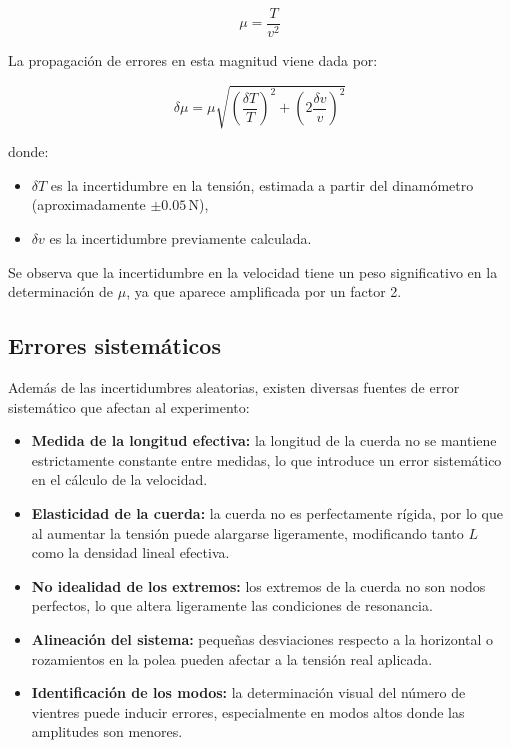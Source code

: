 \documentclass{article}
\begin{document}
\[
\mu = \frac{T}{v^2}
\]

La propagación de errores en esta magnitud viene dada por:

\[
\delta \mu = \mu \sqrt{\left(\frac{\delta T}{T}\right)^2 + \left(2\frac{\delta v}{v}\right)^2}
\]

donde:

\begin{itemize}
    \item $\delta T$ es la incertidumbre en la tensión, estimada a partir del dinamómetro (aproximadamente $\pm 0.05\,\text{N}$),
    \item $\delta v$ es la incertidumbre previamente calculada.
\end{itemize}

Se observa que la incertidumbre en la velocidad tiene un peso significativo en la determinación de $\mu$, ya que aparece amplificada por un factor 2.

\subsection{Errores sistemáticos}

Además de las incertidumbres aleatorias, existen diversas fuentes de error sistemático que afectan al experimento:

\begin{itemize}
    \item \textbf{Medida de la longitud efectiva:} la longitud de la cuerda no se mantiene estrictamente constante entre medidas, lo que introduce un error sistemático en el cálculo de la velocidad.
    
    \item \textbf{Elasticidad de la cuerda:} la cuerda no es perfectamente rígida, por lo que al aumentar la tensión puede alargarse ligeramente, modificando tanto $L$ como la densidad lineal efectiva.
    
    \item \textbf{No idealidad de los extremos:} los extremos de la cuerda no son nodos perfectos, lo que altera ligeramente las condiciones de resonancia.
    
    \item \textbf{Alineación del sistema:} pequeñas desviaciones respecto a la horizontal o rozamientos en la polea pueden afectar a la tensión real aplicada.
    
    \item \textbf{Identificación de los modos:} la determinación visual del número de vientres puede inducir errores, especialmente en modos altos donde las amplitudes son menores.
\end{itemize}
\end{document}
